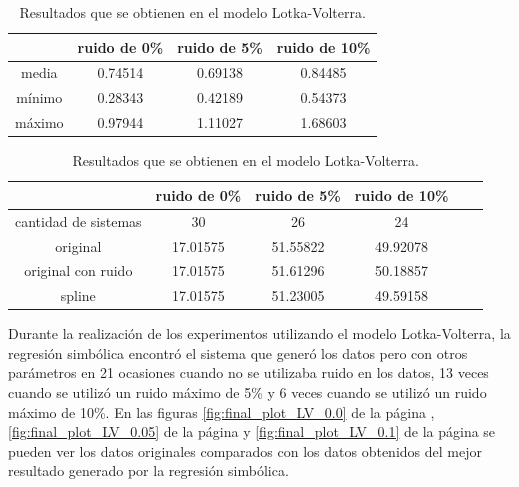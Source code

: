 \begin{table}[!h]
    \centering
    \caption{Resultados que se obtienen en el modelo Lotka-Volterra.}

    \begin{tabular}{|c|c|c|c|}
        \hline
               & \textbf{ruido de 0\%} & \textbf{ruido de 5\%} & \textbf{ruido de 10\%} \\
        \hline
        media  & 0.74514               & 0.69138               & 0.84485                \\
        \hline
        mínimo & 0.28343               & 0.42189               & 0.54373                \\
        \hline
        máximo & 0.97944               & 1.11027               & 1.68603                \\
        \hline
    \end{tabular}

    \begin{tabular}{|c|c|c|c|c|c|}
        \hline
                             & \textbf{ruido de 0\%} & \textbf{ruido de 5\%} & \textbf{ruido de 10\%} \\
        \hline
        cantidad de sistemas & 30                    & 26                    & 24                     \\
        \hline
        original             & 17.01575              & 51.55822              & 49.92078               \\
        \hline
        original con ruido   & 17.01575              & 51.61296              & 50.18857               \\
        \hline
        spline               & 17.01575              & 51.23005              & 49.59158               \\
        \hline
    \end{tabular}

    \label{table:experiment_lotka_volterra}
\end{table}

Durante la realización de los experimentos utilizando el modelo Lotka-Volterra, la regresión simbólica encontró el sistema que generó los datos pero con otros parámetros en 21 ocasiones cuando no se utilizaba ruido en los datos, 13 veces cuando se utilizó un ruido máximo de 5\% y 6 veces cuando se utilizó un ruido máximo de 10\%. En las figuras \ref{fig:final_plot_LV_0.0} de la página \pageref{fig:final_plot_LV_0.0}, \ref{fig:final_plot_LV_0.05} de la página \pageref{fig:final_plot_LV_0.05} y \ref{fig:final_plot_LV_0.1} de la página \pageref{fig:final_plot_LV_0.1} se pueden ver los datos originales comparados con los datos obtenidos del mejor resultado generado por la regresión simbólica.

